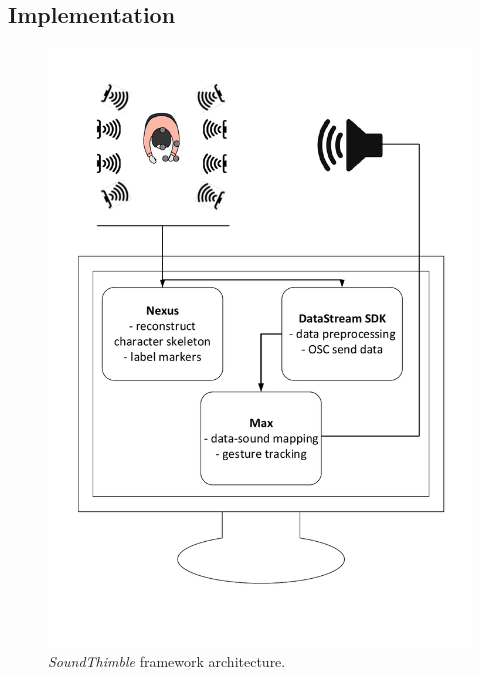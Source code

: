 \documentclass{nime-alternate}
\begin{document}
\subsection{Implementation}



\begin{figure}[t]
	\centering
	\includegraphics[width=.65\columnwidth, clip, trim={0 3cm 0 0}]{img/archi}
	\caption{\textit{SoundThimble} framework architecture.}
	\label{fig:archi}
\end{figure}
\end{document}
